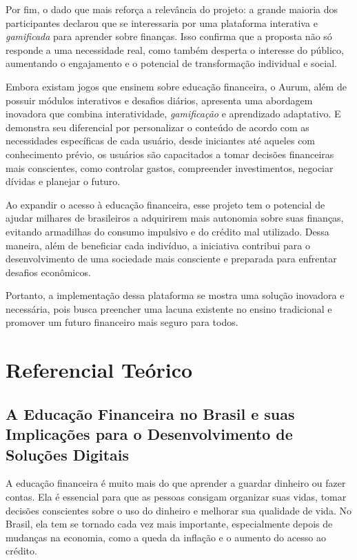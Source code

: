 \documentclass[
	article,			%
	12pt,				%
	oneside,			%
	a4paper,			%
	english,			%
	brazil,				%
	sumario=tradicional
	]{abntex2}
\begin{document}
    Por fim, o dado que mais reforça a relevância do projeto: a grande maioria dos participantes declarou que se interessaria por uma plataforma interativa e \textit{gamificada} para aprender sobre finanças. Isso confirma que a proposta não só responde a uma necessidade real, como também desperta o interesse do público, aumentando o engajamento e o potencial de transformação individual e social.

    Embora existam jogos que ensinem sobre educação financeira, o Aurum, além de possuir módulos interativos e desafios diários, apresenta uma abordagem inovadora que combina interatividade, \textit{gamificação} e aprendizado adaptativo. E demonstra seu diferencial por personalizar o conteúdo de acordo com as necessidades específicas de cada usuário, desde iniciantes até aqueles com conhecimento prévio, os usuários são capacitados a tomar decisões financeiras mais conscientes, como controlar gastos, compreender investimentos, negociar dívidas e planejar o futuro.
    
    Ao expandir o acesso à educação financeira, esse projeto tem o potencial de ajudar milhares de brasileiros a adquirirem mais autonomia sobre suas finanças, evitando armadilhas do consumo impulsivo e do crédito mal utilizado. Dessa maneira, além de beneficiar cada indivíduo, a iniciativa contribui para o desenvolvimento de uma sociedade mais consciente e preparada para enfrentar desafios econômicos.

    Portanto, a implementação dessa plataforma se mostra uma solução inovadora e necessária, pois busca preencher uma lacuna existente no ensino tradicional e promover um futuro financeiro mais seguro para todos.

\section{Referencial Teórico}
\subsection{A Educação Financeira no Brasil e suas Implicações para o Desenvolvimento de Soluções Digitais}
    A educação financeira é muito mais do que aprender a guardar dinheiro ou fazer contas. Ela é essencial para que as pessoas consigam organizar suas vidas, tomar decisões conscientes sobre o uso do dinheiro e melhorar sua qualidade de vida. No Brasil, ela tem se tornado cada vez mais importante, especialmente depois de mudanças na economia, como a queda da inflação e o aumento do acesso ao crédito.
\end{document}
